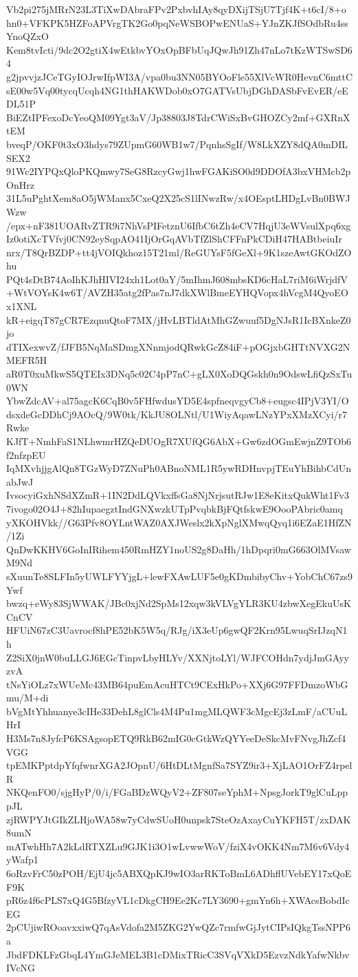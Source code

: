 Vb2pi275jMRrN23L3TiXwDAbraFPv2PxbvhIAy8qyDXijTSjU7Tjf4K+t6cI/8+o
hn0+VFKPK5HZFoAPVrgTK2Go0pqNeWSBOPwENUaS+YJnZKJfSOdbRu4ssYnoQZxO
Kem8tvIcti/9dc2O2gtiX4wEtkbvYOxOpBFbUqJQwJh91Zh47nLo7tKzWTSwSD64
g2jpvvjzJCeTGyIOJrwIfpWI3A/vpa0bu3NN05BYOoFle55XlVcWR0HevnC6mttC
sE00w5Vq00tycqUcqh4NG1thHAKWDob0xO7GATVsUbjDGhDASbFvEvER/eEDL51P
BiEZtIPFexoDcYeoQM09Ygt3aV/Jp38803J8TdrCWiSxBvGHOZCy2mf+GXRnXtEM
bveqP/OKF0t3xO3hdys79ZUpmG60WB1w7/PqnhsSgIf/W8LkXZY8dQA0mDILSEX2
91Wc2IYPQxQloPKQmwy7SeG8RzcyGwj1hwFGAKiSO0d9DDOfA3bxVHMcb2pOnHrz
31L5uPghtXem8aO5jWManx5CxeQ2X25cS1lINwzRw/x4OEsptLHDgLvBn0BWJWzw
/epx+nF381UOARvZTR9i7NhVsPIFetznU6IfbC6tZh4eCV7HqjU3eWVsulXpq6xg
Iz0otiXcTVfvj0CN92eySqpAO41IjOrGqAVbTfZlShCFFnPkCDiH47HABtbeiuIr
nrx/T8QrBZDP+tt4jVOIQkhoz15T21ml/ReGUYsF5fGeXl+9K1szeAwtGKOdZOhu
PQt4sDtB74AoIhKJhHIVI24xh1Lot0aY/5mIhmJ608mbsKD6cHaL7riM6iWrjdfV
+WtVOYsK4w6T/AVZH35atg2fPas7nJ7dkXWlBmeEYHQVopx4hVcgM4QyoEOx1XNL
kR+eigqT87gCR7EzqnuQtoF7MX/jHvLBTldAtMhGZwuuf5DgNJsR1IcBXnkeZ0jo
dTIXexwvZ/fJFB5NqMaSDmgXNnmjodQRwkGcZ84iF+pOGjxbGHTtNVXG2NMEFR5H
aR0T0xuMkwS5QTEIx3DNq5c02C4pP7nC+gLX0XoDQGskh0n9OdswLfiQzSxTu0WN
YbwZdcAV+al75agcK6CqB0v5FHfwdusYD5E4spfneqvgyCb8+eugsc4IPjV3YI/O
dsxdeGcDDhCj9AOcQ/9W0tk/KkJU8OLNtl/U1WiyAqawLNzYPxXMzXCyi/r7Rwke
KJfT+NmhFaS1NLhwmrHZQeDUOgR7XUfQG6AbX+Gw6zdOGmEwjnZ9TOb6f2nfzpEU
IqMXvhjjgAlQn8TGzWyD7ZNuPh0ABnoNML1R5ywRDHnvpjTEuYhBihbCdUnabJwJ
IvsocyiGxhNSdXZmR+1IN2DdLQVkxffsGa8NjNrjsutRJw1E8eKitxQukWht1Fv3
7ivogo02O4J+82hIupaegztIndGNXwzkUTpPvqbkBjFQtfskwE9OooPAbric0amq
yXKOHVkk//G63Pfv8OYLntWAZ0AXJWeslx2kXpNglXMwqQyq1i6EZaE1HfZN/1Zi
QnDwKKHV6GoInIRihem450RmHZY1noUS2g8DaHh/1hDpqri0mG663OlMVsawM9Nd
sXuunTe8SLFIn5yUWLFYYjgL+lewFXAwLUF5e0gKDmbibyChv+YobChC67zs9Ywf
bwzq+eWy83SjWWAK/JBc0xjNd2SpMs12xqw3kVLVgYLR3KU4zbwXegEkuUsKCnCV
HFUiN67zC3Uavrocf8hPE52bK5W5q/RJg/iX3eUp6gwQF2Krn95LwuqSrIJzqN1h
Z2SiX0jnW0buLLGJ6EGcTinpvLbyHLYv/XXNjtoLYl/WJFCOHdn7ydjJmGAyyzvA
tNsYiOLz7xWUeMc43MB64puEmAcuHTCt9CExHkPo+XXj6G97FFDmzoWbGmu/M+di
bVgMtYhhuanye3cIHe33DehL8glCls4M4Pu1mgMLQWF3cMgcEj3zLmF/aCUuLHrI
H3Ms7n8JyfcP6KSAgsopETQ9RkB62mIG0cGtkWzQYYeeDeSkcMvFNvgJhZcf4VGG
tpEMKPptdpYfqfwnrXGA2JOpnU/6HtDLtMgnfSa7SYZ9ir3+XjLAO1OrFZ4rpelR
NKQenFO0/sjgHyP/0/i/FGaBDzWQyV2+ZF807seYphM+NpsgJorkT9glCuLpppJL
zjRWPYJtGIkZLHjoWA58w7yCdwSUoH0unpsk7SteOzAxayCuYKFH5T/zxDAK8umN
mATwhHh7A2kLdRTXZLu9GJK1i3O1wLvwwWoV/fziX4vOKK4Nm7M6v6Vdy4yWafp1
6oRzvFrC50zPOH/EjU4jc5ABXQpKJ9wIO3arRKToBmL6ADhflUVebEY17xQoEF9K
pR6z4f6cPLS7xQ4G5BfzyVL1cDkgCH9Ee2Kc7LY3690+gmYn6h+XWAcsBobdIcEG
2pCUjiwROoavxxiwQ7qAsVdofa2M5ZKG2YwQZc7rmfwGjJytCIPsIQkgTssNPP6a
JbdFDKLFzGbqL4YmGJeMEL3B1cDMixTRicC3SVqVXkD5EzvzNdkYafwNkbvIVcNG
